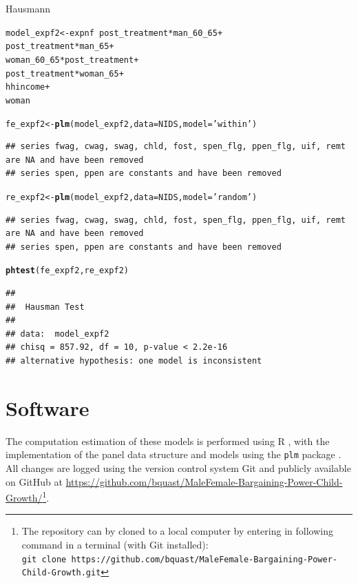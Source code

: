 \documentclass[a4paper,british]{article}\usepackage[]{graphicx}\usepackage[]{color}
\makeatletter
\newcommand{\hlstr}[1]{\textcolor[rgb]{0.192,0.494,0.8}{#1}}%
\newcommand{\hlopt}[1]{\textcolor[rgb]{0,0,0}{#1}}%
\newcommand{\hlstd}[1]{\textcolor[rgb]{0.345,0.345,0.345}{#1}}%
\newcommand{\hlkwb}[1]{\textcolor[rgb]{0.69,0.353,0.396}{#1}}%
\newcommand{\hlkwc}[1]{\textcolor[rgb]{0.333,0.667,0.333}{#1}}%
\newcommand{\hlkwd}[1]{\textcolor[rgb]{0.737,0.353,0.396}{\textbf{#1}}}%
\newenvironment{kframe}{%
 \def\at@end@of@kframe{}%
 \ifinner\ifhmode%
  \def\at@end@of@kframe{\end{minipage}}%
  \begin{minipage}{\columnwidth}%
 \fi\fi%
 \def\FrameCommand##1{\hskip\@totalleftmargin \hskip-\fboxsep
 \colorbox{shadecolor}{##1}\hskip-\fboxsep
     \hskip-\linewidth \hskip-\@totalleftmargin \hskip\columnwidth}%
 \MakeFramed {\advance\hsize-\width
   \@totalleftmargin\z@ \linewidth\hsize
   \@setminipage}}%
 {\par\unskip\endMakeFramed%
 \at@end@of@kframe}
\newenvironment{knitrout}{}{} %
\newcommand{\code}[1]{\texttt{#1}}
\makeatother
\begin{document}
\begin{table}

\caption{Hausmann}

\begin{knitrout}
\color{fgcolor}\begin{kframe}
\begin{alltt}
\hlstd{model_expf2} \hlkwb{<-} \hlstd{expnf} \hlopt{~} \hlstd{post_treatment}\hlopt{*}\hlstd{man_60_65} \hlopt{+}
\hlstd{post_treatment}\hlopt{*}\hlstd{man_65} \hlopt{+}
\hlstd{woman_60_65}\hlopt{*}\hlstd{post_treatment} \hlopt{+}
\hlstd{post_treatment}\hlopt{*}\hlstd{woman_65} \hlopt{+}
\hlstd{hhincome} \hlopt{+}
\hlstd{woman}

\hlstd{fe_expf2} \hlkwb{<-} \hlkwd{plm}\hlstd{(model_expf2,} \hlkwc{data}\hlstd{=NIDS,} \hlkwc{model}\hlstd{=}\hlstr{'within'}\hlstd{)}
\end{alltt}
\begin{verbatim}
## series fwag, cwag, swag, chld, fost, spen_flg, ppen_flg, uif, remt are NA and have been removed
## series spen, ppen are constants and have been removed
\end{verbatim}
\begin{alltt}
\hlstd{re_expf2} \hlkwb{<-} \hlkwd{plm}\hlstd{(model_expf2,} \hlkwc{data}\hlstd{=NIDS,} \hlkwc{model}\hlstd{=}\hlstr{'random'}\hlstd{)}
\end{alltt}
\begin{verbatim}
## series fwag, cwag, swag, chld, fost, spen_flg, ppen_flg, uif, remt are NA and have been removed
## series spen, ppen are constants and have been removed
\end{verbatim}
\begin{alltt}
\hlkwd{phtest}\hlstd{(fe_expf2, re_expf2)}
\end{alltt}
\begin{verbatim}
## 
## 	Hausman Test
## 
## data:  model_expf2
## chisq = 857.92, df = 10, p-value < 2.2e-16
## alternative hypothesis: one model is inconsistent
\end{verbatim}
\end{kframe}
\end{knitrout}

\end{table}


\section{Software}

The computation estimation of these models is performed using R \citep{R},
with the implementation of the panel data structure and models using
the \code{plm} package \citep{croissant2008panel}. All changes are
logged using the version control system Git \citep{git} and publicly
available on GitHub at \href{https://github.com/bquast/MaleFemale-Bargaining-Power-Child-Growth/}{https://github.com/bquast/MaleFemale-Bargaining-Power-Child-Growth/}\footnote{The repository can by cloned to a local computer by entering in following
command in a terminal (with Git installed):\\
\code{git clone https://github.com/bquast/MaleFemale-Bargaining-Power-Child-Growth.git}}.
\end{document}
